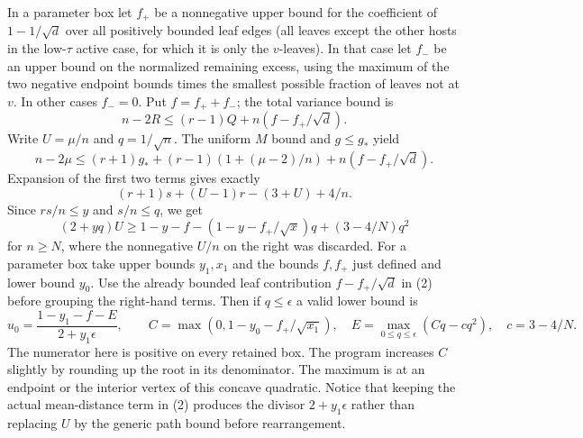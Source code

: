 In a parameter box let $f_+$ be a nonnegative upper bound for the coefficient of $1-1/\sqrt d$ over all positively bounded leaf edges (all leaves except the other hosts in the low-$\tau$ active case, for which it is only the $v$-leaves). In that case let $f_-$ be an upper bound on the normalized remaining excess, using the maximum of the two negative endpoint bounds times the smallest possible fraction of leaves not at $v$. In other cases $f_-=0$. Put $f=f_++f_-$; the total variance bound is
\begin{equation}
 n-2R\le(r-1)Q+n(f-f_+/\sqrt d). \tag{2}
\end{equation}
Write $U=\mu/n$ and $q=1/\sqrt n$. The uniform $M$ bound and $g\le g_*$ yield
\[
 n-2\mu\le(r+1)g_*+(r-1)(1+(\mu-2)/n)+n(f-f_+/\sqrt d).
\]
Expansion of the first two terms gives exactly
\[
 (r+1)s+(U-1)r-(3+U)+4/n .
\]
Since $rs/n\le y$ and $s/n\le q$, we get
\[
 (2+yq)U\ge 1-y-f-(1-y-f_+/\sqrt x)q+(3-4/N)q^2
\]
for $n\ge N$, where the nonnegative $U/n$ on the right was discarded. For a parameter box take upper bounds $y_1,x_1$ and the bounds $f,f_+$ just defined and lower bound $y_0$. Use the already bounded leaf contribution $f-f_+/\sqrt d$ in (2) before grouping the right-hand terms. Then if $q\le\epsilon$ a valid lower bound is
\[
 u_0=\frac{1-y_1-f-E}{2+y_1\epsilon},\qquad
 C=\max(0,1-y_0-f_+/\sqrt{x_1}),\quad
 E=\max_{0\le q\le\epsilon}(Cq-c q^2),\quad c=3-4/N .
\]
The numerator here is positive on every retained box. The program increases $C$ slightly by rounding up the root in its denominator. The maximum is at an endpoint or the interior vertex of this concave quadratic. Notice that keeping the actual mean-distance term in (2) produces the divisor $2+y_1\epsilon$ rather than replacing $U$ by the generic path bound before rearrangement.


